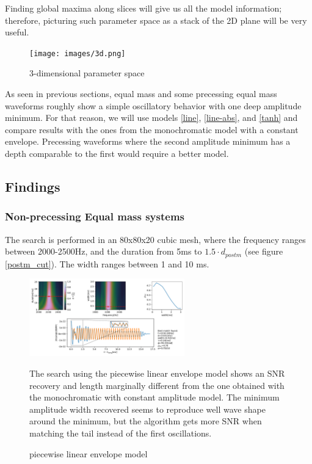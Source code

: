 Finding global maxima along slices will give us all the model information; therefore, picturing such parameter space as a stack of the 2D plane will be very useful.

\begin{figure}[hbt!]
\begin{center}
\texttt{[image: images/3d.png]}
\caption{3-dimensional parameter space}
\end{center}
\end{figure}
\FloatBarrier

As seen in previous sections, equal mass and some precessing equal mass waveforms roughly show a simple oscillatory behavior with one deep amplitude minimum. For that reason, we will use models \ref{line}, \ref{line-abs}, and \ref{tanh} and compare results with the ones from the monochromatic model with a constant envelope. Precessing waveforms where the second amplitude minimum has a depth comparable to the first would require a better model.

\newpage

\subsection*{Findings}



\subsubsection*{Non-precessing Equal mass systems}
The search is performed in an 80x80x20 cubic mesh, where the frequency ranges between 2000-2500Hz, and the duration from 5ms to $1.5\cdot d_{postm}$ (see figure \ref{postm_cut}). The width ranges between 1 and 10 ms.




\begin{figure}[hbt!]
\begin{center}
\includegraphics[width=0.6\textwidth, angle=0]{images/Data_analysis/results/envel_35_lin.pdf}
\caption{piecewise linear envelope model}
\end{center}
The search using the piecewise linear envelope model shows an SNR recovery and length marginally different from the one obtained with the monochromatic with constant amplitude model. The minimum amplitude width recovered seems to reproduce well wave shape around the minimum, but the algorithm gets more SNR when matching the tail instead of the first oscillations. 
\end{figure}


